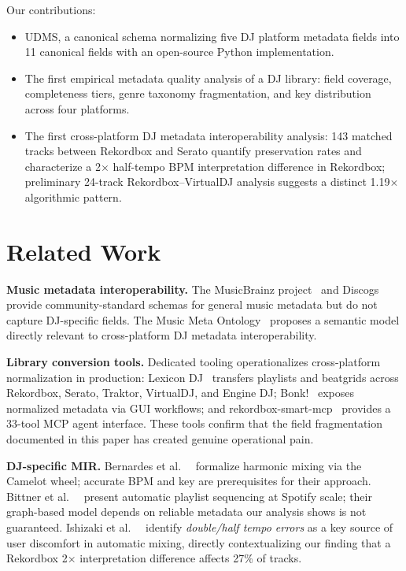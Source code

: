 \documentclass[letterpaper,10pt]{article}
\let\citep\cite  %
\begin{document}
Our contributions:
\begin{itemize}
  \item UDMS, a canonical schema normalizing five DJ platform metadata fields into 11 canonical fields with an open-source Python implementation.
  \item The first empirical metadata quality analysis of a DJ library: field coverage, completeness tiers, genre taxonomy fragmentation, and key distribution across four platforms.
  \item The first cross-platform DJ metadata interoperability analysis: 143 matched tracks between Rekordbox and Serato quantify preservation rates and characterize a 2$\times$ half-tempo BPM interpretation difference in Rekordbox; preliminary 24-track Rekordbox--VirtualDJ analysis suggests a distinct 1.19$\times$ algorithmic pattern.
\end{itemize}

\section{Related Work}

\textbf{Music metadata interoperability.} The MusicBrainz project~\citep{musicbrainz} and Discogs~\citep{discogs} provide community-standard schemas for general music metadata but do not capture DJ-specific fields. The Music Meta Ontology~\citep{deberardinis2023metontology} proposes a semantic model directly relevant to cross-platform DJ metadata interoperability.

\textbf{Library conversion tools.} Dedicated tooling operationalizes cross-platform normalization in production: Lexicon DJ~\citep{lexicondj} transfers playlists and beatgrids across Rekordbox, Serato, Traktor, VirtualDJ, and Engine DJ; Bonk!~\citep{bonk-app} exposes normalized metadata via GUI workflows; and rekordbox-smart-mcp~\citep{rekordbox-smart-mcp} provides a 33-tool MCP agent interface. These tools confirm that the field fragmentation documented in this paper has created genuine operational pain.

\textbf{DJ-specific MIR.} Bernardes et al.~~\citep{bernardes2018harmonic} formalize harmonic mixing via the Camelot wheel; accurate BPM and key are prerequisites for their approach. Bittner et al.~~\citep{bittner2017automatic} present automatic playlist sequencing at Spotify scale; their graph-based model depends on reliable metadata our analysis shows is not guaranteed. Ishizaki et al.~~\citep{ishizaki2009automatic} identify \emph{double/half tempo errors} as a key source of user discomfort in automatic mixing, directly contextualizing our finding that a Rekordbox 2$\times$ interpretation difference affects 27\% of tracks.
\end{document}
